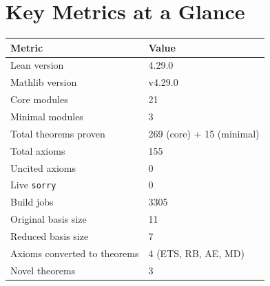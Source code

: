 \documentclass[preprints,article,accept,pdftex,oneauthor]{Definitions/mdpi}
\begin{document}

\maketitle

\newpage
\tableofcontents
\newpage

\section*{Key Metrics at a Glance}

\begin{center}
\begin{tabular}{ll}
\toprule
Metric & Value \\
\midrule
Lean version & 4.29.0 \\
Mathlib version & v4.29.0 \\
Core modules & 21 \\
Minimal modules & 3 \\
Total theorems proven & 269 (core) + 15 (minimal) \\
Total axioms & 155 \\
Uncited axioms & 0 \\
Live \texttt{sorry} & 0 \\
Build jobs & 3305 \\
Original basis size & 11 \\
Reduced basis size & 7 \\
Axioms converted to theorems & 4 (ETS, RB, AE, MD) \\
Novel theorems & 3 \\
\bottomrule
\end{tabular}
\end{center}

\newpage


\newpage

\newpage

\newpage

\newpage

\newpage

\newpage

\newpage

\newpage

\newpage

\newpage

\newpage

\end{document}

